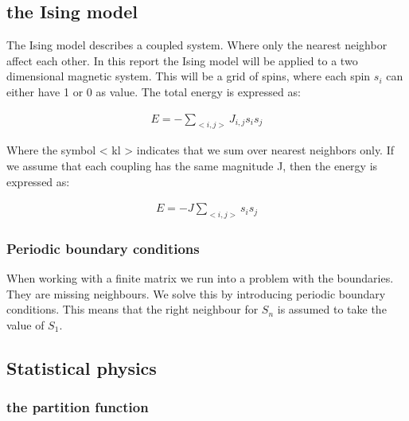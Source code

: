 
\subsection{the Ising model}

The Ising model describes a coupled system. Where only the nearest neighbor affect each other. In this report the Ising model will be applied to a two dimensional magnetic system. This will be a grid of spins, where each spin $s_i$ can either have 1 or 0 as value. The total energy is expressed as: 


\begin{align*}
	E = - \sum_{<i,j>} J_{i,j} s_i s_j
\end{align*}

Where the symbol < kl > indicates that we sum over nearest neighbors only.
If we assume that each coupling has the same magnitude J, then the energy is expressed as: 

\begin{align}
	E = - J \sum_{<i,j>} s_i s_j
	\label{eq:ising-energy}
\end{align}

\subsubsection{Periodic boundary conditions}

When working with a finite matrix we run into a problem with the boundaries. They are missing neighbours. We solve this by introducing periodic boundary conditions. This means that the right neighbour for $S_n$ is assumed to take the value of $S_1$. 





















\subsection{Statistical physics}

\subsubsection{the partition function}\label{sec:z-func}

